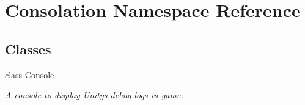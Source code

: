 \hypertarget{namespace_consolation}{}\section{Consolation Namespace Reference}
\label{namespace_consolation}
\subsection*{Classes}
\begin{DoxyCompactItemize}
\item 
class \hyperlink{class_consolation_1_1_console}{Console}
\begin{DoxyCompactList}\small\item\em A console to display Unity\textquotesingle{}s debug logs in-\/game. \end{DoxyCompactList}\end{DoxyCompactItemize}

